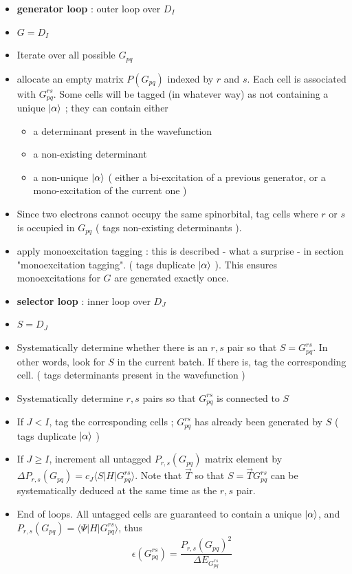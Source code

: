 \documentclass[./thesis.tex]{subfiles}
\begin{document}
\begin{itemize}
\item
\textbf{generator loop} : outer loop over $D_I$
\item
$G = D_I$
\item
Iterate over all possible $G_{pq}$

\item
allocate an empty matrix $P(G_{pq})$ indexed by $r$ and $s$. Each cell is associated with $G^{rs}_{pq}$. Some cells will be tagged (in whatever way) as not containing a unique $\ket \alpha$ ; they can contain either
\begin{itemize}
\item
a determinant present in the wavefunction
\item
a non-existing determinant
\item
a non-unique $\ket \alpha$ ( either a bi-excitation of a previous generator, or a mono-excitation of the current one )
\end{itemize}

\item
Since two electrons cannot occupy the same spinorbital, tag cells where $r$ or $s$ is occupied in $G_{pq}$ ( tags non-existing determinants ). 
\item
apply monoexcitation tagging : this is described - what a surprise - in section "monoexcitation tagging". ( tags duplicate $\ket \alpha$ ). This ensures monoexcitations for $G$ are generated exactly once.
\item
\textbf{selector loop} : inner loop over $D_J$ 
\item
$S = D_J$
\item
Systematically determine whether there is an $r,s$ pair so that $S=G_{pq}^{rs}$. In other words, look for $S$ in the current batch. If there is, tag the corresponding cell. ( tags determinants present in the wavefunction )
\item
Systematically determine $r,s$ pairs so that $G_{pq}^{rs}$ is connected to $S$
\item
If $J<I$, tag the corresponding cells ; $G_{pq}^{rs}$ has already been generated by $S$ ( tags duplicate $\ket \alpha$ )
\item
If $J \geq I$, increment all untagged $P_{r,s}(G_{pq})$ matrix element by $\Delta P_{r,s}(G_{pq}) = c_J\langle S| H|  G^{rs}_{pq} \rangle$. Note that $\overrightarrow{T}$ so that $S=\overrightarrow{T}G^{rs}_{pq}$ can be systematically deduced at the same time as the $r,s$ pair.
\item
End of loops. All untagged cells are guaranteed to contain a unique $\ket \alpha$, and $P_{r,s}(G_{pq}) = \langle \Psi |H|G^{rs}_{pq} \rangle$, thus\\

\begin{equation}
\epsilon(G_{pq}^{rs}) = \frac{P_{r,s}(G_{pq})^2}{\Delta E_{G^{rs}_{pq}}}
\end{equation}

\end{itemize}
\end{document}
